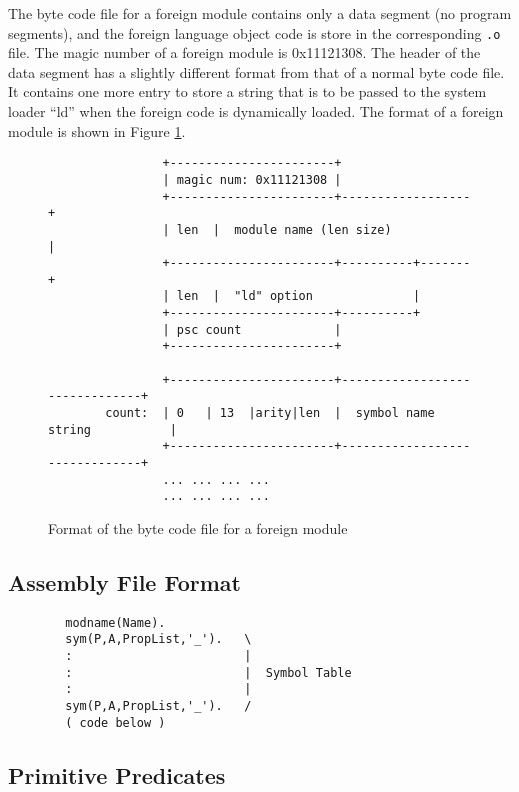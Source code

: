 \documentclass[11pt]{article}
\begin{document}
The byte code file for a foreign module contains only a data segment
(no program segments), and the foreign language object code is store
in the corresponding {\tt *.o} file. The magic number of a foreign module
is 0x11121308.  The header of the data segment has a slightly different
format from that of a normal byte code file. It contains one more entry
to store a string that is to be passed to the system loader ``ld'' when
the foreign code is dynamically loaded. The format of a foreign module
is shown in Figure \ref{f:formod}.

\begin{figure}
\begin{verbatim}
                +-----------------------+
                | magic num: 0x11121308 |
                +-----------------------+------------------+
                | len  |  module name (len size)           |
                +-----------------------+----------+-------+
                | len  |  "ld" option              |
                +-----------------------+----------+
                | psc count             |
                +-----------------------+

                +-----------------------+-------------------------------+
        count:  | 0   | 13  |arity|len  |  symbol name string           |
                +-----------------------+-------------------------------+
                ... ... ... ...
                ... ... ... ...
\end{verbatim}
\caption{Format of the byte code file for a foreign module}
\label{f:formod}
\end{figure}

\subsection{Assembly File Format}

\begin{verbatim}
        modname(Name).
        sym(P,A,PropList,'_').   \
        :                        |
        :                        |  Symbol Table
        :                        |
        sym(P,A,PropList,'_').   /
        ( code below )
\end{verbatim}


\subsection{Primitive Predicates}
\end{document}
